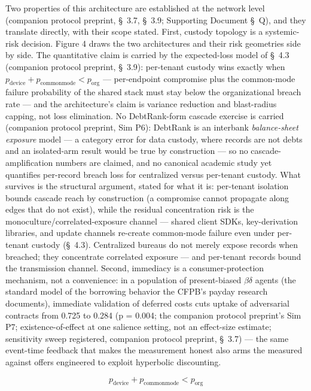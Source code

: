 \documentclass[11pt,twocolumn]{article}
\begin{document}
Two properties of this architecture are established at the network level (companion protocol preprint, \S~3.7, \S~3.9; Supporting Document \S~Q), and they translate directly, with their scope stated. First, custody topology is a systemic-risk decision. Figure 4 draws the two architectures and their risk geometries side by side. The quantitative claim is carried by the expected-loss model of \S~4.3 (companion protocol preprint, \S~3.9): per-tenant custody wins exactly when $p_{\mathrm{device}} + p_{\mathrm{commonmode}} < p_{\mathrm{org}}$ --- per-endpoint compromise plus the common-mode failure probability of the shared stack must stay below the organizational breach rate --- and the architecture's claim is variance reduction and blast-radius capping, not loss elimination. No DebtRank-form cascade exercise is carried (companion protocol preprint, Sim P6): DebtRank is an interbank \emph{balance-sheet exposure} model --- a category error for data custody, where records are not debts and an isolated-arm result would be true by construction --- so no cascade-amplification numbers are claimed, and no canonical academic study yet quantifies per-record breach loss for centralized versus per-tenant custody. What survives is the structural argument, stated for what it is: per-tenant isolation bounds cascade reach by construction (a compromise cannot propagate along edges that do not exist), while the residual concentration risk is the monoculture/correlated-exposure channel --- shared client SDKs, key-derivation libraries, and update channels re-create common-mode failure even under per-tenant custody (\S~4.3). Centralized bureaus do not merely expose records when breached; they concentrate correlated exposure --- and per-tenant records bound the transmission channel. Second, immediacy is a consumer-protection mechanism, not a convenience: in a population of present-biased $\beta\delta$ agents (the standard model of the borrowing behavior the CFPB's payday research documents), immediate validation of deferred costs cuts uptake of adversarial contracts from 0.725 to 0.284 (p = 0.004; the companion protocol preprint's Sim P7; existence-of-effect at one salience setting, not an effect-size estimate; sensitivity sweep registered, companion protocol preprint, \S~3.7) --- the same event-time feedback that makes the measurement honest also arms the measured against offers engineered to exploit hyperbolic discounting.


\begin{equation}
p_{\mathrm{device}} + p_{\mathrm{commonmode}} < p_{\mathrm{org}}
\label{eq:breakeven}
\end{equation}
\end{document}

